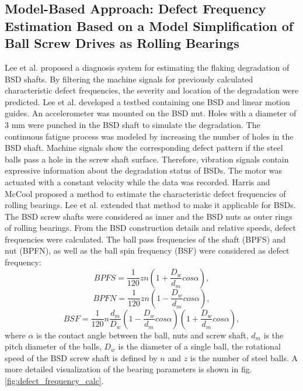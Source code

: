 \subsection{Model-Based Approach: Defect Frequency Estimation Based on a Model Simplification of Ball Screw Drives as Rolling Bearings}
Lee et al. \cite{Lee2015} proposed a diagnosis system for estimating the flaking degradation of BSD shafts. By filtering the machine signals for previously calculated characteristic defect frequencies, the severity and location of the degradation were predicted. Lee et al. developed a testbed containing one BSD and linear motion guides. An accelerometer was mounted on the BSD nut. Holes with a diameter of 3 mm were punched in the BSD shaft to simulate the degradation. The continuous fatigue process was modeled by increasing the number of holes in the BSD shaft. Machine signals show the corresponding defect pattern if the steel balls pass a hole in the screw shaft surface. Therefore, vibration signals contain expressive information about the degradation status of BSDs. The motor was actuated with a constant velocity while the data was recorded. Harris and McCool \cite{Harris1996} proposed a method to estimate the characteristic defect frequencies of rolling bearings. Lee et al. \cite{Lee2015} extended that method to make it applicable for BSDs. The BSD screw shafts were considered as inner and the BSD nuts as outer rings of rolling bearings. From the BSD construction details and relative speeds, defect frequencies were calculated. The ball pass frequencies of the shaft (BPFS) and nut (BPFN), as well as the ball spin frequency (BSF) were considered as defect frequency: 
\begin{equation}
    BPFS = \frac{1}{120}zn(1+\frac{D_{w}}{d_{m}}cos\alpha),
    \label{eq:defect_frequency}
\end{equation}
\begin{equation}
    BPFN = \frac{1}{120}zn(1-\frac{D_{w}}{d_{m}}cos\alpha),
\end{equation}
\begin{equation}
    BSF = \frac{1}{120}n\frac{d_{m}}{D_{w}} (1-\frac{D_{w}}{d_{m}}cos\alpha)(1+\frac{D_{w}}{d_{m}}cos\alpha) ,
\end{equation}
where $\alpha$ is the contact angle between the ball, nuts and screw shaft, $d_{m}$ is the pitch diameter of the balls, $D_{w}$ is the diameter of a single ball, the rotational speed of the BSD screw shaft is defined by $n$ and $z$ is the number of steel balls. A more detailed visualization of the bearing parameters is shown in fig. \ref{fig:defect_frequency_calc}. 

